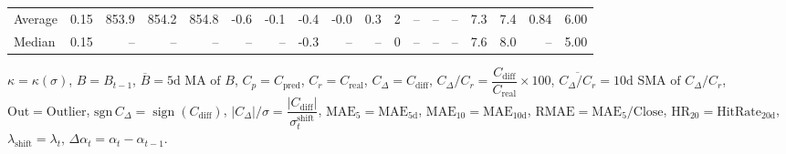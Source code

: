 \begin{threeparttable}
{\begin{tabular}{lrrrrrrrrrrrrrrrrr}
Average &     0.15 & 853.9 & 854.2 & 854.8 &       -0.6 &           -0.1 &                      -0.4 &                     -0.0 &                 0.3 &              2 &         -- &        -- &             -- &              7.3 &                 7.4 &            0.84 &                   6.00 \\
 Median &     0.15 &    -- &    -- &    -- &         -- &             -- &                      -0.3 &                       -- &                  -- &              0 &         -- &        -- &             -- &              7.6 &                 8.0 &              -- &                   5.00 \\
\bottomrule
\end{tabular}
}
\begin{tablenotes}\footnotesize
\item $\kappa=\kappa(\sigma)$, $B=B_{t-1}$, $\overline{B}=\text{5d MA of }B$, $C_p=C_{\text{pred}}$, $C_r=C_{\text{real}}$, $C_\Delta=C_{\text{diff}}$, $C_\Delta/C_r=\dfrac{C_{\text{diff}}}{C_{\text{real}}}\times100$, $\overline{C_\Delta/C_r}=\text{10d SMA of }C_\Delta/C_r$, $\mathrm{Out}=\text{Outlier}$, $\mathrm{sgn}\,C_\Delta=\operatorname{sign}(C_{\text{diff}})$, $|C_\Delta|/\sigma=\dfrac{|C_{\text{diff}}|}{\sigma_t^{\text{shift}}}$, $\mathrm{MAE}_5=\mathrm{MAE}_{5\text{d}}$, $\mathrm{MAE}_{10}=\mathrm{MAE}_{10\text{d}}$, $\mathrm{RMAE}= \mathrm{MAE}_5 / \text{Close}$, $\mathrm{HR}_{20}=\mathrm{HitRate}_{20\text{d}}$, $\lambda_{\text{shift}}=\lambda_t$, $\Delta\alpha_t=\alpha_t-\alpha_{t-1}$.
\end{tablenotes}
\end{threeparttable}
\endgroup

